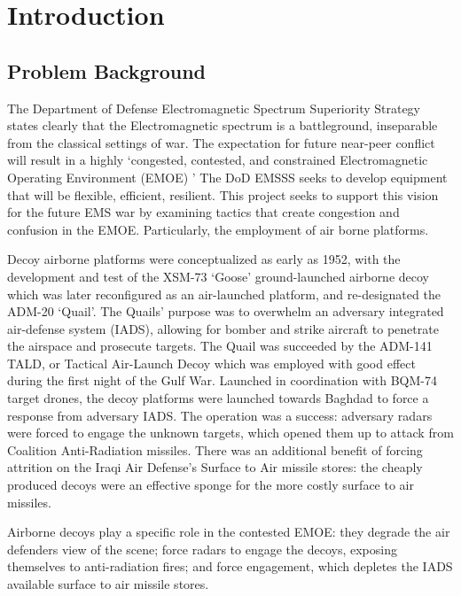 \chapter{Introduction}
\label{ch:introduction}
\glsresetall

\section{Problem Background}
\label{ch:problem_statement}

The Department of Defense Electromagnetic Spectrum Superiority Strategy states clearly that the Electromagnetic spectrum is a battleground, inseparable from the classical settings of war. The expectation for future near-peer conflict will result in a highly `congested, contested, and constrained Electromagnetic Operating Environment (EMOE) \cite{DOD_ESSS}' The DoD EMSSS seeks to develop equipment that will be flexible, efficient, resilient. This project seeks to support this vision for the future EMS war by examining tactics that create congestion and confusion in the EMOE. Particularly, the employment of air borne platforms.

Decoy airborne platforms were conceptualized as early as 1952, with the development and test of the XSM-73 `Goose' ground-launched airborne decoy which was later reconfigured as an air-launched platform, and re-designated the ADM-20 `Quail'. The Quails' purpose was to overwhelm an adversary integrated air-defense system (IADS), allowing for bomber and strike aircraft to penetrate the airspace and prosecute targets. The Quail was succeeded by the ADM-141 TALD, or Tactical Air-Launch Decoy which was employed with good effect during the first night of the Gulf War. Launched in coordination with BQM-74 target drones, the decoy platforms were launched towards Baghdad to force a response from adversary IADS. The operation was a success:  adversary radars were forced to engage the unknown targets, which opened them up to attack from Coalition Anti-Radiation missiles. There was an additional benefit of forcing attrition on the Iraqi Air Defense's Surface to Air missile stores:  the cheaply produced decoys were an effective sponge for the more costly surface to air missiles.

Airborne decoys play a specific role in the contested EMOE:  they degrade the air defenders view of the scene; force radars to engage the decoys, exposing themselves to anti-radiation fires; and force engagement, which depletes the IADS available surface to air missile stores.

